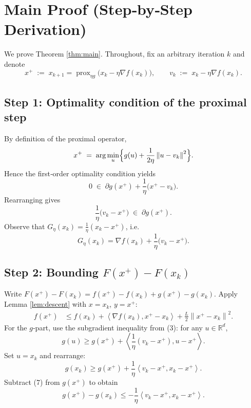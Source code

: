 \documentclass{article}
\newcommand{\prox}{\operatorname{prox}}
\newcommand{\grad}{\nabla}
\newcommand{\norm}[1]{\left\lVert #1\right\rVert}
\newcommand{\inner}[2]{\left\langle #1,#2\right\rangle}
\newcommand{\R}{\mathbb{R}}
\begin{document}
\section*{Main Proof (Step‑by‑Step Derivation)}
We prove Theorem \ref{thm:main}. Throughout, fix an arbitrary iteration $k$ and denote
\[
x^{+}\;:=\;x_{k+1}=\prox_{\eta g}\!\bigl(x_{k}-\eta\grad f(x_{k})\bigr),\qquad
v_{k}\;:=\;x_{k}-\eta\grad f(x_{k}).
\]

\subsection*{Step 1: Optimality condition of the proximal step}
By definition of the proximal operator,
\[
x^{+}\;=\;\arg\min_{u}\Bigl\{g(u)+\frac{1}{2\eta}\norm{u-v_{k}}^{2}\Bigr\}.
\]
Hence the first‑order optimality condition yields
\begin{equation}
0\;\in\;\partial g(x^{+})+\frac{1}{\eta}\bigl(x^{+}-v_{k}\bigr).
\tag{2}
\end{equation}
Rearranging gives
\begin{equation}
\frac{1}{\eta}\bigl(v_{k}-x^{+}\bigr)\;\in\;\partial g(x^{+}).
\tag{3}
\end{equation}
Observe that $G_{\eta}(x_{k})=\frac{1}{\eta}(x_{k}-x^{+})$, i.e.
\begin{equation}
G_{\eta}(x_{k})=\grad f(x_{k})+\frac{1}{\eta}\bigl(v_{k}-x^{+}\bigr).
\tag{4}
\end{equation}

\subsection*{Step 2: Bounding $F(x^{+})-F(x_{k})$}
Write $F(x^{+})-F(x_{k})=f(x^{+})-f(x_{k})+g(x^{+})-g(x_{k})$.
Apply Lemma \ref{lem:descent} with $x=x_{k}$, $y=x^{+}$:
\begin{align}
f(x^{+}) &\le f(x_{k})+\inner{\grad f(x_{k})}{x^{+}-x_{k}}+\frac{L}{2}\norm{x^{+}-x_{k}}^{2}.
\tag{5}
\end{align}
For the $g$‑part, use the subgradient inequality from (3): for any $u\in\R^{d}$,
\[
g(u)\ge g(x^{+})+\inner{\frac{1}{\eta}(v_{k}-x^{+})}{u-x^{+}}.
\tag{6}
\]
Set $u=x_{k}$ and rearrange:
\[
g(x_{k})\ge g(x^{+})+\frac{1}{\eta}\inner{v_{k}-x^{+}}{x_{k}-x^{+}}.
\tag{7}
\]
Subtract (7) from $g(x^{+})$ to obtain
\[
g(x^{+})-g(x_{k})\le -\frac{1}{\eta}\inner{v_{k}-x^{+}}{x_{k}-x^{+}}.
\tag{8}
\]
\end{document}
